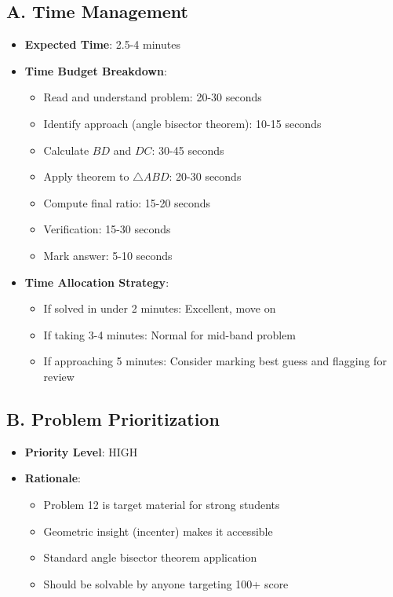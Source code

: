 \documentclass[12pt]{article}
\begin{document}
\begin{competitionbox}
\subsection*{A. Time Management}
\begin{itemize}[leftmargin=*]
    \item \textbf{Expected Time}: 2.5-4 minutes
    
    \item \textbf{Time Budget Breakdown}:
    \begin{itemize}
        \item Read and understand problem: 20-30 seconds
        \item Identify approach (angle bisector theorem): 10-15 seconds
        \item Calculate $BD$ and $DC$: 30-45 seconds
        \item Apply theorem to $\triangle ABD$: 20-30 seconds
        \item Compute final ratio: 15-20 seconds
        \item Verification: 15-30 seconds
        \item Mark answer: 5-10 seconds
    \end{itemize}
    
    \item \textbf{Time Allocation Strategy}:
    \begin{itemize}
        \item If solved in under 2 minutes: Excellent, move on
        \item If taking 3-4 minutes: Normal for mid-band problem
        \item If approaching 5 minutes: Consider marking best guess and flagging for review
    \end{itemize}
\end{itemize}

\subsection*{B. Problem Prioritization}
\begin{itemize}[leftmargin=*]
    \item \textbf{Priority Level}: HIGH
    
    \item \textbf{Rationale}:
    \begin{itemize}
        \item Problem 12 is target material for strong students
        \item Geometric insight (incenter) makes it accessible
        \item Standard angle bisector theorem application
        \item Should be solvable by anyone targeting 100+ score
    \end{itemize}
    

\end{itemize}
\end{competitionbox}
\end{document}
